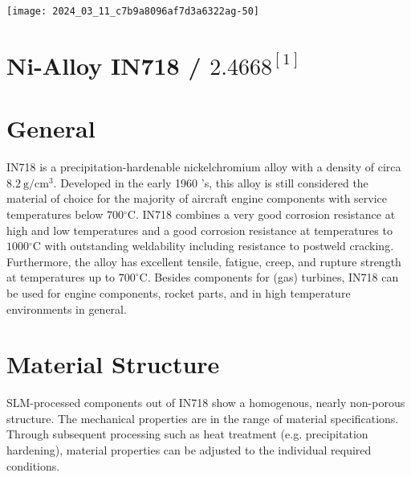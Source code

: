 \documentclass[10pt]{article}
\begin{document}
\begin{center}
\texttt{[image: 2024\_03\_11\_c7b9a8096af7d3a6322ag-50]}
\end{center}

\section*{Ni-Alloy IN718 / $2.4668^{[1]}$}
\section*{General}
IN718 is a precipitation-hardenable nickelchromium alloy with a density of circa $8.2 \mathrm{~g} / \mathrm{cm}^{3}$. Developed in the early 1960 's, this alloy is still considered the material of choice for the majority of aircraft engine components with service temperatures below $700{ }^{\circ} \mathrm{C}$. IN718 combines a very good corrosion resistance at high and low temperatures and a good corrosion resistance at temperatures to $1000{ }^{\circ} \mathrm{C}$ with outstanding weldability including resistance to postweld cracking. Furthermore, the alloy has excellent tensile, fatigue, creep, and rupture strength at temperatures up to $700^{\circ} \mathrm{C}$. Besides components for (gas) turbines, IN718 can be used for engine components, rocket parts, and in high temperature environments in general.

\section*{Material Structure}
SLM-processed components out of IN718 show a homogenous, nearly non-porous structure. The mechanical properties are in the range of material specifications. Through subsequent processing such as heat treatment (e.g. precipitation hardening), material properties can be adjusted to the individual required conditions.
\end{document}
